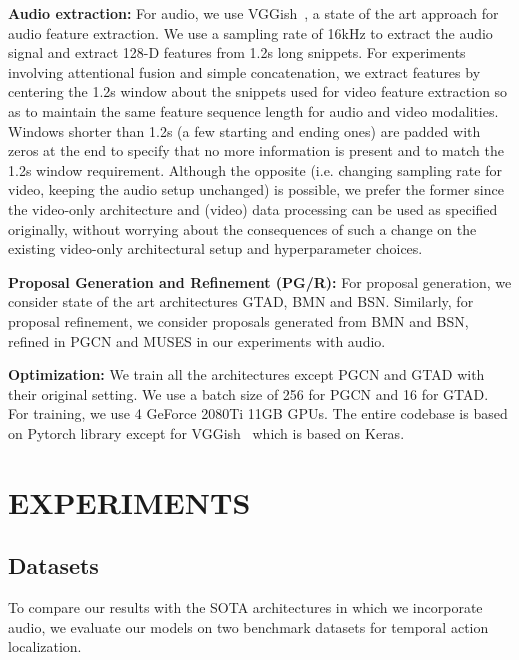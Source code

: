 \documentclass[10pt,twocolumn,letterpaper]{article}
\begin{document}
\noindent \textbf{Audio extraction:} For audio, we use VGGish~\cite{hershey2017cnn}, a state of the art approach for audio feature extraction. We use a sampling rate of 16kHz to extract the audio signal and extract 128-D features from 1.2s long snippets. For experiments involving attentional fusion and simple concatenation, we extract features by centering the 1.2s window about the snippets used for video feature extraction so as to maintain the same feature sequence length for audio and video modalities. Windows shorter than 1.2s (a few starting and ending ones) are padded with zeros at the end to specify that no more information is present and to match the 1.2s window requirement. Although the opposite (i.e. changing sampling rate for video, keeping the audio setup unchanged) is possible, we prefer the former since the video-only architecture and (video) data processing can be used as specified originally, without worrying about the consequences of such a change on the existing video-only architectural setup and hyperparameter choices.


\noindent \textbf{Proposal Generation and Refinement (PG/R):} For proposal generation, we consider state of the art architectures GTAD\cite{Xu_2020_CVPR}, BMN\cite{DBLP:journals/corr/abs-1907-09702} and BSN\cite{DBLP:journals/corr/abs-1806-02964}. Similarly, for proposal refinement, we consider proposals generated from BMN and BSN, refined in PGCN\cite{PGCN2019ICCV} and MUSES\cite{Liu_2021_CVPR} in our experiments with audio.

\noindent \textbf{Optimization:} We train all the architectures except PGCN and GTAD with their original setting. We use a batch size of 256 for PGCN and 16 for GTAD. For training, we use 4 GeForce 2080Ti 11GB GPUs. The entire codebase is based on Pytorch library except for VGGish~\cite{hershey2017cnn} which is based on Keras.

\section{\uppercase{Experiments}}



\subsection{Datasets}
\label{sec:datasets}

To compare our results with the SOTA architectures in which we incorporate audio, we evaluate our models on two benchmark datasets for temporal action localization. 
\end{document}

